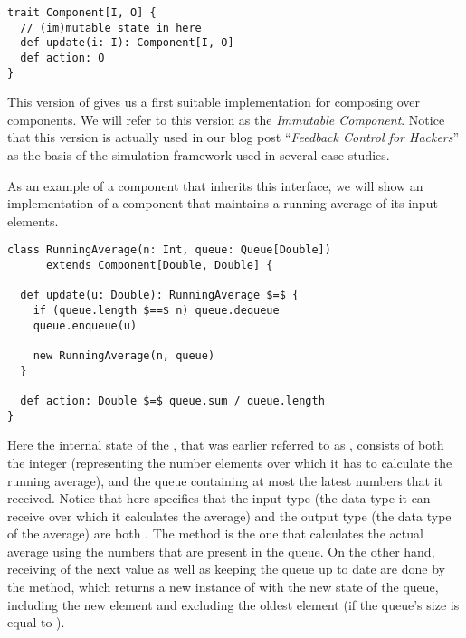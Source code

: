 \begin{lstlisting}[style=InlineScalaStyle]
trait Component[I, O] {
  // (im)mutable state in here
  def update(i: I): Component[I, O]
  def action: O
}
\end{lstlisting}

This version of \comp gives us a first suitable implementation for composing over components. We will refer to this version as the \textit{Immutable Component}. Notice that this version is actually used in our blog post ``\textit{Feedback Control for Hackers}'' \cite{heest2015-feedback-for-hackers} as the basis of the simulation framework used in several case studies.

As an example of a component that inherits this interface, we will show an implementation of a component that maintains a running average of its input elements.

\begin{lstlisting}[style=ScalaStyle, caption={Implementation of \code{RunningAverage} using the \textit{Immutable Component} interface}, label={lst:immutable-runningaverage}]
class RunningAverage(n: Int, queue: Queue[Double])
      extends Component[Double, Double] {

  def update(u: Double): RunningAverage $=$ {
    if (queue.length $==$ n) queue.dequeue
    queue.enqueue(u)

    new RunningAverage(n, queue)
  }

  def action: Double $=$ queue.sum / queue.length
}
\end{lstlisting}

Here the internal state of the \comp, that was earlier referred to as , consists of both the integer  (representing the number elements over which it has to calculate the running average), and the queue containing at most the latest  numbers that it received. Notice that  here specifies that the input type (the data type it can receive over which it calculates the average) and the output type (the data type of the average) are both . The  method is the one that calculates the actual average using the numbers that are present in the queue. On the other hand, receiving of the next value as well as keeping the queue up to date are done by the  method, which returns a new instance of  with the new state of the queue, including the new element and excluding the oldest element (if the queue's size is equal to ).

